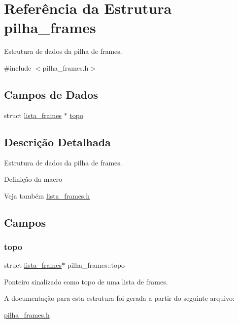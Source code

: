 \hypertarget{structpilha__frames}{}\section{Referência da Estrutura pilha\+\_\+frames}
\label{structpilha__frames}


Estrutura de dados da pilha de frames.  




{\ttfamily \#include $<$pilha\+\_\+frames.\+h$>$}

\subsection*{Campos de Dados}
\begin{DoxyCompactItemize}
\item 
struct \hyperlink{structlista__frames}{lista\+\_\+frames} $\ast$ \hyperlink{structpilha__frames_a0f1e93df36de953f6ee6789cea5fd34f}{topo}
\end{DoxyCompactItemize}


\subsection{Descrição Detalhada}
Estrutura de dados da pilha de frames. 

Definição da macro

\begin{DoxySeeAlso}{Veja também}
\hyperlink{lista__frames_8h}{lista\+\_\+frames.\+h} 
\end{DoxySeeAlso}


\subsection{Campos}
\mbox{\label{structpilha__frames_a0f1e93df36de953f6ee6789cea5fd34f}} 
\subsubsection{\texorpdfstring{topo}{topo}}
{\footnotesize\ttfamily struct \hyperlink{structlista__frames}{lista\+\_\+frames}$\ast$ pilha\+\_\+frames\+::topo}

Ponteiro sinalizado como \textquotesingle{}topo\textquotesingle{} de uma lista de frames. 

A documentação para esta estrutura foi gerada a partir do seguinte arquivo\+:\begin{DoxyCompactItemize}
\item 
\hyperlink{pilha__frames_8h}{pilha\+\_\+frames.\+h}\end{DoxyCompactItemize}
